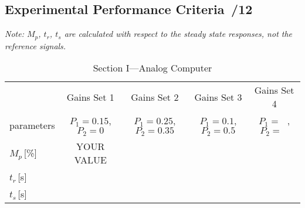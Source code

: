 \documentclass{article}
\newcommand{\score}{\hfill \underline{\hspace{0.65cm}}\,/} %
\begin{document}
\subsection{Experimental Performance Criteria \score 12}
\emph{Note: $M_p$, $t_r$, $t_s$ are calculated with respect to the steady state responses, not the reference signals.}
\begin{table}[phtb]\footnotesize 
\begin{center}
\caption{Section I---Analog Computer}
\label{tbl:lab5_q1_2}
\begin{tabular}{l|m{1.2cm}|m{1.2cm}|m{1.2cm}|m{1.2cm}|m{1.2cm}|m{1.2cm}|m{1.2cm}|m{1.2cm}} \hline \hline
\cellcolor{lightgray} & \multicolumn{2}{c|}{\cellcolor{lightgray}Gains Set 1} & \multicolumn{2}{c|}{\cellcolor{lightgray}Gains Set 2} & \multicolumn{2}{c|}{\cellcolor{lightgray}Gains Set 3} & \multicolumn{2}{c}{\cellcolor{lightgray}Gains Set 4}\\ \cline{2-9}
\multirow{-2}{*}{\cellcolor{lightgray}parameters}& \multicolumn{2}{c|}{$P_1 = 0.15$, $P_2 = 0$}& \multicolumn{2}{c|}{$P_1 = 0.25$, $P_2 = 0.35$}& \multicolumn{2}{c|}{$P_1 = 0.1$, $P_2 = 0.5$}& \multicolumn{2}{c}{$P_1 = ~~~$, $P_2 = ~~~$}\\ \hline
$M_p$\,[\%]& \multicolumn{2}{c|}{YOUR VALUE} & \multicolumn{2}{c|}{~} & \multicolumn{2}{c|}{~} & \multicolumn{2}{c}{~} \\ \hline
$t_r$\,[\si{\second}] & \multicolumn{2}{c|}{} & \multicolumn{2}{c|}{} & \multicolumn{2}{c|}{} & \multicolumn{2}{c}{} \\ \hline
$t_s$\,[\si{\second}] & \multicolumn{2}{c|}{} & \multicolumn{2}{c|}{} & \multicolumn{2}{c|}{} & \multicolumn{2}{c}{} \\ \hline
\end{tabular}
\end{center}
\end{table}
\end{document}
